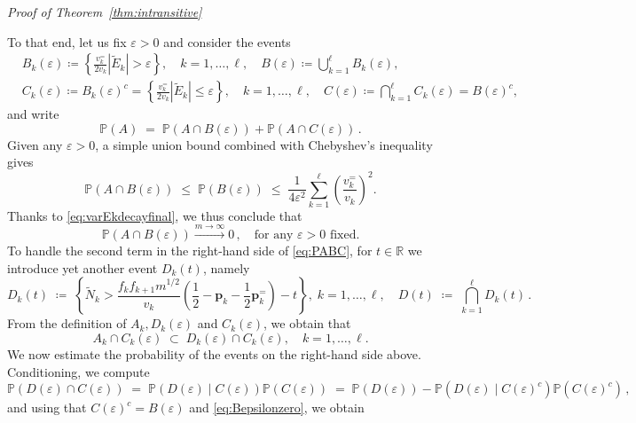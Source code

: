 \documentclass[reqno,a4paper,11pt]{amsart}
\makeatletter
\theoremstyle{remark}
\newcommand{\mb}[1]{{\mathbf #1}}
\newcommand{\bb}[1]{{\mathbb #1}}
\numberwithin{equation}{section}
\renewenvironment{proof}[1][Proof]{\par
\pushQED{\qed}%
\normalfont \topsep6\p@\@plus6\p@\relax
\trivlist
\item\relax
{\itshape
#1\@addpunct{.}}\hspace\labelsep\ignorespaces
}{%
\popQED\endtrivlist\@endpefalse
}
\makeatother
\begin{document}
\begin{proof}[Proof of Theorem~\ref{thm:intransitive}]
To that end, let us fix $\varepsilon>0$ and consider the events
\begin{align*}
& B_k(\varepsilon)\coloneqq \left\{\frac{v_k^=}{2v_k}|\widetilde E_k|>\varepsilon\right\}, \quad k=1,\hdots, \ell,\quad B(\varepsilon)\coloneqq \bigcup_{k=1}^\ell B_k(\varepsilon),\\
%
& C_k(\varepsilon)\coloneqq B_k(\varepsilon)^c = \left\{\frac{v_k^=}{2v_k}|\widetilde E_k|\leq \varepsilon\right\}, \quad k=1,\hdots, \ell,\quad C(\varepsilon)\coloneqq \bigcap_{k=1}^\ell C_k(\varepsilon)=B(\varepsilon)^c,
\end{align*}
%
and write
%
\begin{equation}\label{eq:PABC}
\bb P(A)\;=\;\bb P(A\cap B(\varepsilon))+\bb P (A\cap C(\varepsilon))\,.
\end{equation}
%
Given any $\varepsilon>0$, a simple union bound combined with Chebyshev's inequality gives
%
\begin{equation}\label{eq:Bepsilonzero}
\bb P(A\cap B(\varepsilon))\;\leq\; \bb P(B(\varepsilon)) \;\leq\; \frac{1}{4\varepsilon^2}\sum_{k=1}^\ell \left(\frac{v_k^=}{v_k}\right)^2.
\end{equation}
%
Thanks to \eqref{eq:varEkdecayfinal}, we thus conclude that
%
\begin{equation}\label{eq:estPABepsilon}
\bb P(A\cap B(\varepsilon))\stackrel{m\to\infty}{\longrightarrow} 0\,,\quad \text{for any } \varepsilon>0 \text{ fixed}.
\end{equation}
%
To handle the second term in the right-hand side of \eqref{eq:PABC}, for $t\in \bb R$ we introduce yet another event $D_k(t)$, namely
%
$$
D_k(t)\;\coloneqq\;
\left\{
\widetilde N_k>\frac{f_kf_{k+1}m^{1/2}}{v_k}\left(\frac{1}{2}-\mb p_k-\frac{1}{2}\mb p_k^=\right)-t
\right\}
,\; k=1,\hdots,\ell,\quad D(t)\;\coloneqq\; \bigcap_{k=1}^\ell D_k(t)\,.
$$
%
From the definition of $A_k,D_k(\varepsilon)$ and $C_k(\varepsilon)$, we obtain that
%
\begin{equation}\label{eq:inclusionACD}
A_k\cap C_k(\varepsilon)\;\subset\; D_k(\varepsilon)\cap C_k(\varepsilon), \quad k=1,\hdots, \ell.
\end{equation}
%
We now estimate the probability of the events on the right-hand side above. Conditioning, we compute
%
$$
\bb P(D(\varepsilon)\cap C(\varepsilon))\;=\;\bb  P(D(\varepsilon)\mid C(\varepsilon))\bb P(C(\varepsilon)) \;=\; \bb P(D(\varepsilon))-\bb P(D(\varepsilon)\mid C(\varepsilon)^c)\bb P(C(\varepsilon)^c)\,,
$$
%
and using that $C(\varepsilon)^c=B(\varepsilon)$ and \eqref{eq:Bepsilonzero}, we obtain

\end{proof}
\end{document}
